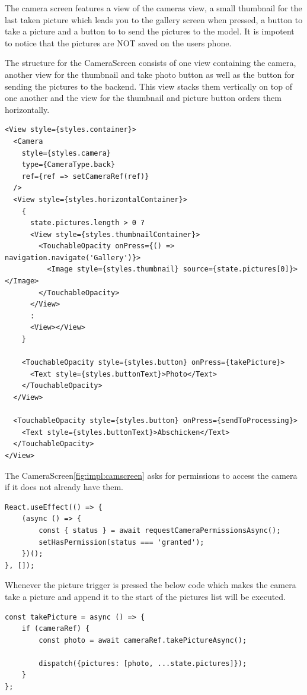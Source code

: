 The camera screen features a view of the cameras view,
a small thumbnail for the last taken picture which leads you to the gallery screen when pressed,
a button to take a picture and a button to to send the pictures to the model.
It is impotent to notice that the pictures are NOT saved on the users phone.

The structure for the CameraScreen consists of one view containing the camera, another view for the thumbnail and take photo button as well as the button for sending the pictures to the backend. This view stacks them vertically on top of one another and the view for the thumbnail and picture button orders them horizontally.

\begin{lstlisting}[caption=CameraScreen display code,label=lst:impl:cameraScreenDisplay]
<View style={styles.container}>
  <Camera
    style={styles.camera}
    type={CameraType.back}
    ref={ref => setCameraRef(ref)}
  />
  <View style={styles.horizontalContainer}>
    {
      state.pictures.length > 0 ?
      <View style={styles.thumbnailContainer}>
        <TouchableOpacity onPress={() => navigation.navigate('Gallery')}>
          <Image style={styles.thumbnail} source={state.pictures[0]}></Image>
        </TouchableOpacity>
      </View>
      :
      <View></View>
    }
    
    <TouchableOpacity style={styles.button} onPress={takePicture}>
      <Text style={styles.buttonText}>Photo</Text>
    </TouchableOpacity>
  </View>
  
  <TouchableOpacity style={styles.button} onPress={sendToProcessing}>
    <Text style={styles.buttonText}>Abschicken</Text>
  </TouchableOpacity>
</View>
\end{lstlisting}

The CameraScreen\ref{fig:impl:camscreen} asks for permissions to access the camera if it does not already have them.

\begin{lstlisting}[caption=Code for camera permissions,label=lst:impl:campermissions]
React.useEffect(() => {
    (async () => {
        const { status } = await requestCameraPermissionsAsync();
        setHasPermission(status === 'granted');
    })();
}, []);
\end{lstlisting}

Whenever the picture trigger is pressed the below code which makes the camera take a picture and append it to the start of the pictures list will be executed. 

\begin{lstlisting}[caption=Code for taking pictures,label=lst:impl:takepicture]
const takePicture = async () => {
    if (cameraRef) {
        const photo = await cameraRef.takePictureAsync();
    
        dispatch({pictures: [photo, ...state.pictures]});
    }
};
\end{lstlisting}

